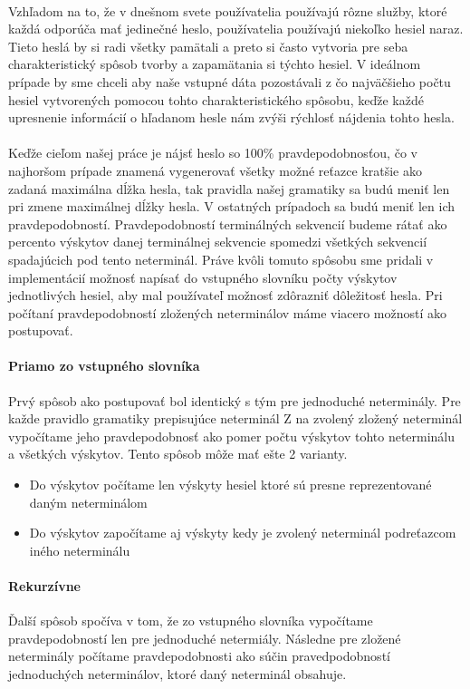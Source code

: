 \paragraph{}
Vzhľadom na to, že v dnešnom svete používatelia používajú rôzne služby, ktoré každá odporúča mať jedinečné heslo, používatelia používajú niekoľko hesiel naraz. Tieto heslá by si radi všetky pamätali a preto si často vytvoria pre seba charakteristický spôsob tvorby a zapamätania si týchto hesiel. V ideálnom prípade by sme chceli aby naše vstupné dáta pozostávali z čo najväčšieho počtu hesiel vytvorených pomocou tohto charakteristického spôsobu, keďže každé upresnenie informácií o hľadanom hesle nám zvýši rýchlosť nájdenia tohto hesla.
\paragraph{}
Keďže cieľom našej práce je nájsť heslo so 100\% pravdepodobnosťou, čo v najhoršom prípade znamená vygenerovať všetky možné reťazce kratšie ako zadaná maximálna dĺžka hesla, tak pravidla našej gramatiky sa budú meniť len pri zmene maximálnej dĺžky hesla. V ostatných prípadoch sa budú meniť len ich pravdepodobností. Pravdepodobností terminálných sekvencií budeme rátať ako percento výskytov danej terminálnej sekvencie spomedzi všetkých sekvencií spadajúcich pod tento neterminál. Práve kvôli tomuto spôsobu sme pridali v implementácií možnosť napísať do vstupného slovníku počty výskytov jednotlivých hesiel, aby mal používateľ možnosť zdôrazniť dôležitosť hesla. Pri počítaní pravdepodobností zložených neterminálov máme viacero možností ako postupovať.
\paragraph{Priamo zo vstupného slovníka}
Prvý spôsob ako postupovať bol identický s tým pre jednoduché neterminály. Pre každe pravidlo gramatiky prepisujúce neterminál Z na zvolený zložený neterminál vypočítame jeho pravdepodobnosť ako pomer počtu výskytov tohto neterminálu a všetkých výskytov. Tento spôsob môže mať ešte 2 varianty.
\begin{itemize}
	\item Do výskytov počítame len výskyty hesiel ktoré sú presne reprezentované daným neterminálom
	\item Do výskytov započítame aj výskyty kedy je zvolený neterminál podreťazcom iného neterminálu
\end{itemize}

\paragraph{Rekurzívne}
Ďalší spôsob spočíva v tom, že zo vstupného slovníka vypočítame pravdepodobností len pre jednoduché netermiály. Následne pre zložené neterminály počítame pravdepodobnosti ako súčin pravedpodobností jednoduchých neterminálov, ktoré daný neterminál obsahuje.
